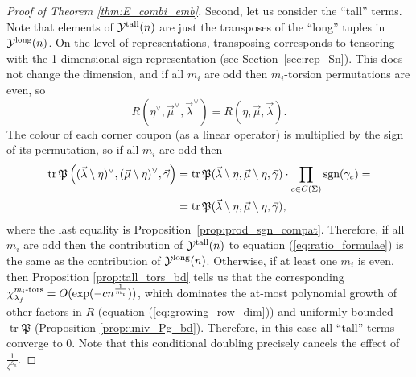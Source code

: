 \documentclass{amsart}
\newcommand{\tn}{\textnormal}
\newcommand{\tr}{\operatorname{tr}}
\begin{document}
\begin{proof}[Proof of Theorem \ref{thm:E_combi_emb}]
Second, let us consider the ``tall'' terms. Note that elements of $\mathcal{Y}^\tn{tall}(n)$ are just the transposes of the ``long'' tuples in $\mathcal{Y}^\tn{long}(n)$. On the level of representations, transposing corresponds to tensoring with the 1-dimensional sign representation (see Section~\ref{sec:rep_Sn}). This does not change the dimension, and if all $m_i$ are odd then $m_i$-torsion permutations are even, so
\begin{equation*}
R(\eta^\vee,\vec\mu^\vee,\vec\lambda^\vee)=R(\eta,\vec\mu,\vec\lambda).
\end{equation*}
The colour of each corner coupon (as a linear operator) is multiplied by the sign of its permutation, so if all $m_i$ are odd then
\begin{align*}
\tr\mathfrak{P}\left((\vec\lambda\setminus\eta)^\vee,(\vec\mu\setminus\eta)^\vee,\vec\gamma\right)&=\tr\mathfrak{P}(\vec\lambda\setminus\eta,\vec\mu\setminus\eta,\vec\gamma)\cdot\prod_{c\in C(\Sigma)}\tn{sgn}(\gamma_c)=\\
&=\tr\mathfrak{P}(\vec\lambda\setminus\eta,\vec\mu\setminus\eta,\vec\gamma),
\end{align*}
where the last equality is Proposition~\ref{prop:prod_sgn_compat}. Therefore, if all $m_i$ are odd then the contribution of $\mathcal{Y}^\tn{tall}(n)$ to equation (\ref{eq:ratio_formulae}) is the same as the contribution of $\mathcal{Y}^\tn{long}(n)$. Otherwise, if at least one $m_i$ is even, then Proposition \ref{prop:tall_tors_bd} tells us that the corresponding $\chi_{\lambda_f}^{m_i\tn{-tors}}=O(\exp(-cn^{\frac{1}{m_i}}))$, which dominates the at-most polynomial growth of other factors in $R$ (equation (\ref{eq:growing_row_dim})) and uniformly bounded $\tr\mathfrak{P}$ (Proposition \ref{prop:univ_Pg_bd}). Therefore, in this case all ``tall'' terms converge to 0. Note that this conditional doubling precisely cancels the effect of $\tfrac{1}{\zeta^{S_n}}$.


\end{proof}
\end{document}
